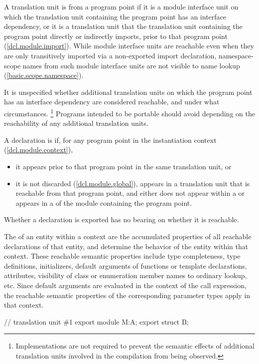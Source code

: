 \begin{std.txt}\color{addclr}
\resetalinea[0]
\alinea
A translation unit is  from a program point if
it is a module interface unit on which the translation unit containing the
program point has an interface dependency, or
it is a translation unit that the translation unit containing the
program point directly or indirectly imports,
prior to that program point (\ref{dcl.module.import}).
\enternote
While module interface units are reachable even when they are only
transitively imported via a non-exported import declaration,
namespace-scope names from such module interface units are not visible
to name lookup (\ref{basic.scope.namespace}).
\exitnote

\alinea
It is unspecified whether additional translation units on which the
program point has an interface dependency are considered reachable,
and under what circumstances.%
\footnote{Implementations are not required to prevent the semantic effects of
additional translation units involved in the compilation from being
observed.}
Programs intended to be portable should avoid
depending on the reachability of any additional translation units.

\alinea
A declaration is  if, for any program point in the
instantiation context (\ref{dcl.module.context}),
\begin{itemize}
\item it appears prior to that program point in the same translation unit, or
\item it is not discarded (\ref{dcl.module.global}),
appears in a translation unit that is reachable from that program point,
and
either does not appear within a 
or appears in a 
of the module containing the program point.
\end{itemize}
\enternote
Whether a declaration is exported has no bearing on whether it is reachable.
\exitnote

\alinea
The  of an entity within a context
are the accumulated properties of all reachable declarations of
that entity, and determine the behavior of the entity within
that context.
\enternote
These reachable semantic properties include type completeness,
type definitions, initializers,
default arguments of functions or template declarations, attributes,
visibility of class or enumeration member names to ordinary lookup,
etc.
Since default arguments are evaluated in the context of the call expression,
the reachable semantic properties of the corresponding parameter types apply in 
that context.
\begin{example}
\begin{codeblock}
// translation unit \#1
export module M:A;
export struct B;


\end{codeblock}
\end{example}
\end{std.txt}
